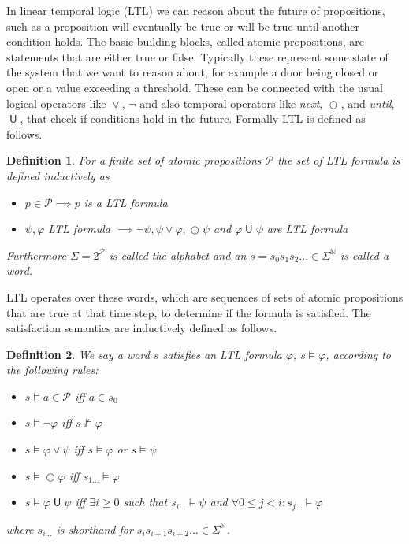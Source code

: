 \documentclass[12pt, a4paper]{article}
\theoremstyle{plain}
\newtheorem*{definition}{Definition}
\DeclareMathOperator{\od}{\vee}
\DeclareMathOperator{\nxt}{\bigcirc}
\DeclareMathOperator{\until}{\textsf{U}}
\DeclareMathOperator{\sat}{\vDash}
\DeclareMathOperator{\nsat}{\nvDash}
\renewcommand{\phi}{\varphi}
\newcommand{\N}{\mathbb{N}}
\renewcommand{\P}{\mathcal{P}}
\begin{document}
In linear temporal logic (LTL) we can reason about the future of propositions, such as a proposition will eventually be true or will be true until another condition holds. The basic building blocks, called atomic propositions, are statements that are either true or false. Typically these represent some state of the system that we want to reason about, for example a door being closed or open or a value exceeding a threshold. These can be connected with the usual logical operators like $\od$, $\neg$ and also temporal operators like \emph{next}, $\nxt$, and \emph{until}, $\until$, that check if conditions hold in the future. Formally LTL is defined as follows.

\begin{definition}
	For a finite set of atomic propositions $\P$ the set of \emph{LTL formula} is defined inductively as
	\begin{itemize}
		\item $p\in\P \implies p$ is a LTL formula
		\item $\psi, \phi$ LTL formula $\implies \neg\psi, \psi\od\phi, \nxt\psi$ and $\phi\until\psi$ are LTL formula
	\end{itemize}
	Furthermore $\Sigma = 2^{\P}$ is called the \emph{alphabet} and an $s = s_0 s_1 s_2 ... \in \Sigma^{\N}$ is called a \emph{word}.
\end{definition}

LTL operates over these words, which are sequences of sets of atomic propositions that are true at that time step, to determine if the formula is satisfied. The satisfaction semantics are inductively defined as follows.

\begin{definition}
	We say a word $s$ \emph{satisfies} an LTL formula $\phi$, $s\sat\phi$, according to the following rules:
	\begin{itemize}
		\item $s\sat a\in\P$ iff $a\in s_0$
		\item $s\sat\neg\phi$ iff $s\nsat\phi$
		\item $s\sat\phi\od\psi$ iff $s\sat\phi$ or $s\sat\psi$
		\item $s\sat\nxt\phi$ iff $s_{1\dots}\sat\phi$
		\item $s\sat\phi\until\psi$ iff $\exists i\ge 0$ such that $s_{i\dots}\sat\psi$ and $\forall 0 \le j < i : s_{j\dots}\sat\phi$
	\end{itemize}
	where $s_{i\dots}$ is shorthand for $s_i s_{i+1} s_{i+2} \dots \in \Sigma^\N$.
\end{definition}
\end{document}
